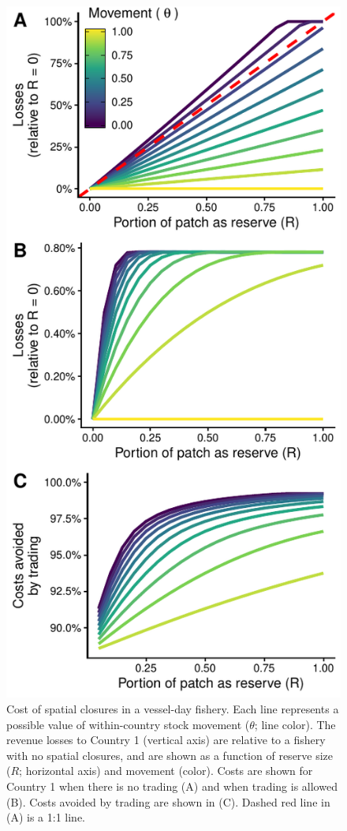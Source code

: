 \documentclass[12pt]{article}
\begin{document}
\begin{figure}[htbp]
\centering
\includegraphics{img/PNA_model.pdf}
\caption{\label{fig:PNA_model}Cost of spatial closures in a vessel-day fishery. Each line represents a possible value of within-country stock movement ($\theta$; line color). The revenue losses to Country 1 (vertical axis) are relative to a fishery with no spatial closures, and are shown as a function of reserve size ($R$; horizontal axis) and movement (color). Costs are shown for Country 1 when there is no trading (A) and when trading is allowed (B). Costs avoided by trading are shown in (C). Dashed red line in (A) is a 1:1 line.}
\end{figure}
\end{document}
